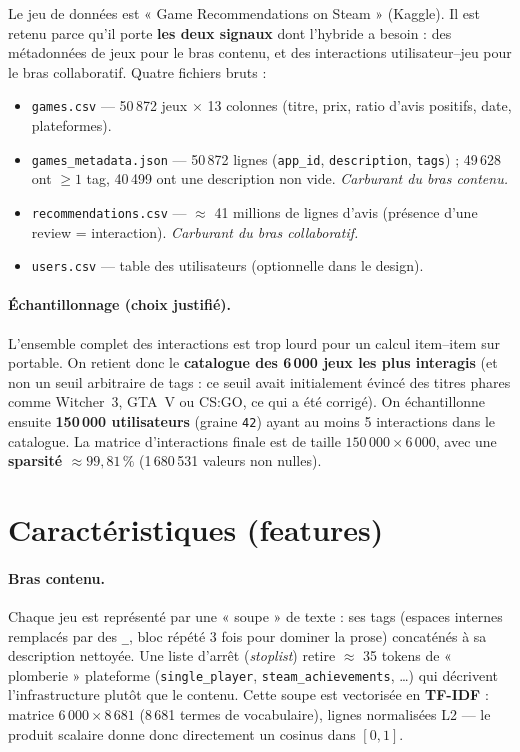 \documentclass[11pt,a4paper]{article}
\begin{document}
Le jeu de données est « Game Recommendations on Steam » (Kaggle). Il est retenu
parce qu'il porte \textbf{les deux signaux} dont l'hybride a besoin : des
métadonnées de jeux pour le bras contenu, et des interactions utilisateur–jeu
pour le bras collaboratif. Quatre fichiers bruts :

\begin{itemize}
  \item \texttt{games.csv} — 50\,872 jeux $\times$ 13 colonnes (titre, prix,
        ratio d'avis positifs, date, plateformes).
  \item \texttt{games\_metadata.json} — 50\,872 lignes (\texttt{app\_id},
        \texttt{description}, \texttt{tags}) ; 49\,628 ont $\geq 1$ tag,
        40\,499 ont une description non vide. \emph{Carburant du bras contenu.}
  \item \texttt{recommendations.csv} — $\approx$ 41 millions de lignes d'avis
        (présence d'une review = interaction). \emph{Carburant du bras
        collaboratif.}
  \item \texttt{users.csv} — table des utilisateurs (optionnelle dans le design).
\end{itemize}

\paragraph{Échantillonnage (choix justifié).} L'ensemble complet des
interactions est trop lourd pour un calcul item--item sur portable. On retient
donc le \textbf{catalogue des 6\,000 jeux les plus interagis} (et non un seuil
arbitraire de tags : ce seuil avait initialement évincé des titres phares comme
Witcher~3, GTA~V ou CS:GO, ce qui a été corrigé). On échantillonne ensuite
\textbf{150\,000 utilisateurs} (graine \texttt{42}) ayant au moins 5
interactions dans le catalogue. La matrice d'interactions finale est de taille
$150\,000 \times 6\,000$, avec une \textbf{sparsité $\approx 99{,}81\,\%$}
(1\,680\,531 valeurs non nulles).

\section{Caractéristiques (features)}

\paragraph{Bras contenu.} Chaque jeu est représenté par une « soupe » de texte :
ses tags (espaces internes remplacés par des \texttt{\_}, bloc répété 3 fois pour
dominer la prose) concaténés à sa description nettoyée. Une liste d'arrêt
(\emph{stoplist}) retire $\approx$ 35 tokens de « plomberie » plateforme
(\texttt{single\_player}, \texttt{steam\_achievements}, \dots) qui décrivent
l'infrastructure plutôt que le contenu. Cette soupe est vectorisée en
\textbf{TF-IDF} : matrice $6\,000 \times 8\,681$ (8\,681 termes de vocabulaire),
lignes normalisées L2 — le produit scalaire donne donc directement un cosinus
dans $[0,1]$.
\end{document}
